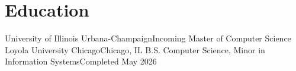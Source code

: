 \documentclass[letterpaper,10pt]{article}
\begin{document}
\section*{Education}
\resumeSubHeadingListStart
  \resumeSubheading
    {University of Illinois Urbana-Champaign}{Incoming}
    {Master of Computer Science}{}
  \resumeSubheading
    {Loyola University Chicago}{Chicago, IL}
    {B.S. Computer Science, Minor in Information Systems}{Completed May 2026}
    \resumeItemListStart
    \resumeItemListEnd
\resumeSubHeadingListEnd
\end{document}
